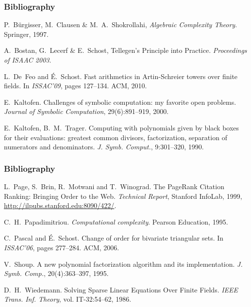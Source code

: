 \documentclass[10pt]{beamer}
\begin{document}
\begin{frame}
  \frametitle{Bibliography}

  \begin{thebibliography}{1}
  
  P.~Bürgisser, M.~Clausen \& M.~A.~Shokrollahi,
    \newblock \emph{Algebraic Complexity Theory}.
    \newblock Springer, 1997.
    
  A.~Bostan, G.~Lecerf \& E.~Schost,
    \newblock Tellegen's Principle into Practice.
    \newblock \emph{Proceedings of ISAAC 2003}.

    L.~De~Feo and {\'E}.~Schost.
    \newblock Fast arithmetics in Artin-Schreier towers over finite fields. 
    \newblock In \emph{ISSAC'09}, pages 127--134. ACM, 2010.

    E.~Kaltofen.
    \newblock Challenges of symbolic computation: my
    favorite open problems.
    \newblock \emph{Journal of Symbolic Computation}, 29(6):891--919, 2000.

    E.~Kaltofen, B.~M.~Trager.
    \newblock Computing with polynomials given by black boxes for their
    evaluations: greatest common divisors, factorization, separation of 
    numerators and denominators.
    \newblock \emph{J. Symb. Comput.}, 9:301--320, 1990.

  \end{thebibliography}
\end{frame}

\begin{frame}
  \frametitle{Bibliography}

  \begin{thebibliography}{1}
  
    L.~Page, S.~Brin, R.~Motwani and T.~Winograd.
    \newblock The PageRank Citation Ranking: Bringing Order to the Web.
    \newblock \emph{Technical Report}, Stanford InfoLab, 1999,
    \url{http://ilpubs.stanford.edu:8090/422/}.

    C.~H.~Papadimitriou.
    \newblock \emph{Computational complexity}.
    \newblock Pearson Education, 1995.
    
    C.~Pascal and \'E.~Schost.
    \newblock Change of order for bivariate triangular sets.
    \newblock In \emph{ISSAC'06}, pages 277--284. ACM, 2006.
    
    V.~Shoup.
    \newblock A new polynomial factorization algorithm and its implementation.
    \newblock \emph{J. Symb. Comp.}, 20(4):363--397, 1995.
    
    D.~H.~Wiedemann.
    \newblock Solving Sparse Linear Equations Over Finite Fields.
    \newblock \emph{IEEE Trans. Inf. Theory}, vol. IT-32:54--62, 1986.

  \end{thebibliography}
\end{frame}
\end{document}
